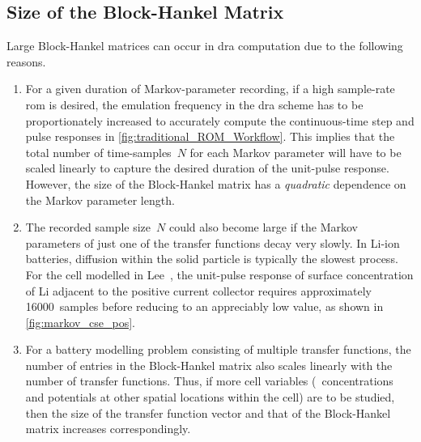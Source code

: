 \subsection{Size of the Block-Hankel Matrix}\label{sec:size-of-the}

Large Block-Hankel matrices can occur in \gls{dra} computation due to the
following reasons.
\begin{enumerate}
    \item
        For  a  given   duration  of  Markov-parameter  recording,   if  a  high
        sample-rate   \gls{rom}  is   desired,   the   emulation  frequency   in
        the   \gls{dra}  scheme   has   to  be   proportionately  increased   to
        accurately  compute  the continuous-time  step  and  pulse responses  in
        \cref{fig:traditional_ROM_Workflow}. This implies  that the total number
        of time-samples~$N$  for each  Markov parameter will  have to  be scaled
        linearly to  capture the  desired duration  of the  unit-pulse response.
        However,  the size  of the  Block-Hankel matrix  has a  \emph{quadratic}
        dependence on the Markov parameter length.
    \item
        The  recorded sample  size~$N$ could  also  become large  if the  Markov
        parameters of just  one of the transfer functions decay  very slowly. In
        Li-ion batteries, diffusion  within the solid particle  is typically the
        slowest process.  For the cell  modelled in Lee~\etal{},  the unit-pulse
        response of surface concentration of Li adjacent to the positive current
        collector  requires approximately  16000~samples before  reducing to  an
        appreciably low value, as shown in \cref{fig:markov_cse_pos}.
    \item
        For  a  battery  modelling   problem  consisting  of  multiple  transfer
        functions,  the  number  of  entries in  the  Block-Hankel  matrix  also
        scales linearly  with the  number of transfer  functions. Thus,  if more
        cell  variables (\eg~concentrations and  potentials at  other spatial
        locations  within the  cell) are  to be  studied, then  the size  of the
        transfer function vector  and that of the  Block-Hankel matrix increases
        correspondingly.
\end{enumerate}

